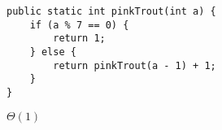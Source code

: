 \begin{blocksection}
\question
\begin{lstlisting}
public static int pinkTrout(int a) {
    if (a % 7 == 0) {
        return 1;
    } else {
        return pinkTrout(a - 1) + 1;
    }
}
\end{lstlisting}

\begin{solution}
$\Theta(1)$
\end{solution}
\end{blocksection}
